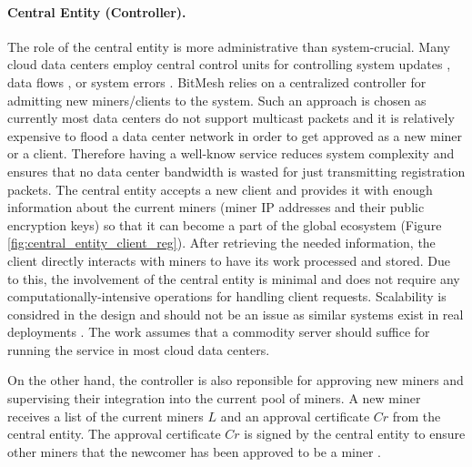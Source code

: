\documentclass[11px]{article}
\newcommand{\projTitle}{BitMesh\xspace}
\begin{document}
\paragraph{Central Entity (Controller).} The role of the central entity is more administrative than system-crucial. Many cloud data centers employ central control units for controlling system updates \cite{microsoft-autopilot}, data flows \cite{google_jupiter}, or system errors \cite{microsoft_netpoirot}. {\projTitle} relies on a centralized controller for admitting new miners/clients to the system. Such an approach is chosen as currently most data centers do not support multicast packets and it is relatively expensive to flood a data center network in order to get approved as a new miner or a client. Therefore having a well-know service reduces system complexity and ensures that no data center bandwidth is wasted for just transmitting registration packets. The central entity accepts a new client and provides it with enough information about the current miners (miner IP addresses and their public encryption keys) so that it can become a part of the global ecosystem (Figure \ref{fig:central_entity_client_reg}). After retrieving the needed information, the client directly interacts with miners to have its work processed and stored. Due to this, the involvement of the central entity is minimal and does not require any computationally-intensive operations for handling client requests. Scalability is considred in the design and should not be an issue as similar systems exist in real deployments \cite{hadoop_example}. The work assumes that a commodity server should suffice for running the service in most cloud data centers.
\par


\noindent \newline On the other hand, the controller is also reponsible for approving new miners and supervising their integration into the current pool of miners. A new miner receives a list of the current miners $L$ and an approval certificate $Cr$ from the central entity.
The approval certificate $Cr$ is signed by the central entity to ensure other miners that the newcomer has been approved to be a miner \cite{public-auth-certificate}.
\end{document}
